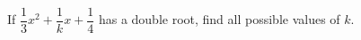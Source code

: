 If $\dfrac{1}{3}x^2+\dfrac{1}{k}x+\dfrac{1}{4}$ has a double root, find all possible values of $k$.
